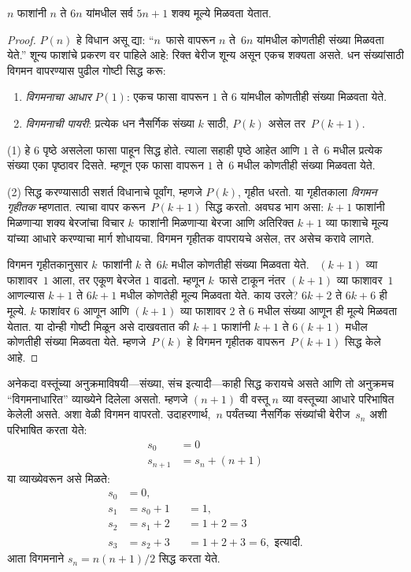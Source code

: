\documentclass[../../../include/open-logic-section]{subfiles}
\begin{document}
\begin{thm}
$n$ फाशांनी $n$ ते $6n$ यांमधील सर्व $5n+1$ शक्य मूल्ये मिळवता येतात.
\end{thm}

\begin{proof}
$P(n)$ हे विधान असू द्या: “$n$~फासे वापरून $n$ ते~$6n$ यांमधील कोणतीही संख्या मिळवता येते.” शून्य फाशांचे प्रकरण वर पाहिले आहे: रिक्त बेरीज शून्य असून एकच शक्यता असते. धन संख्यांसाठी विगमन वापरण्यास पुढील गोष्टी सिद्ध करू:
\begin{enumerate}
\item \emph{विगमनाचा आधार} $P(1)$: एकच फासा वापरून $1$ ते $6$ यांमधील कोणतीही संख्या मिळवता येते.
\item \emph{विगमनाची पायरी}: प्रत्येक धन नैसर्गिक संख्या $k$ साठी, $P(k)$ असेल तर~$P(k+1)$.
\end{enumerate}

(1) हे $6$ पृष्ठे असलेला फासा पाहून सिद्ध होते. त्याला सहाही पृष्ठे आहेत आणि $1$ ते~$6$ मधील प्रत्येक संख्या एका पृष्ठावर दिसते. म्हणून एक फासा वापरून $1$ ते~$6$ मधील कोणतीही संख्या मिळवता येते.

(2) सिद्ध करण्यासाठी सशर्त विधानाचे पूर्वांग, म्हणजे $P(k)$, गृहीत धरतो. या गृहीतकाला \emph{विगमन गृहीतक} म्हणतात. त्याचा वापर करून~$P(k+1)$ सिद्ध करतो. अवघड भाग असा: $k+1$ फाशांनी मिळणाऱ्या शक्य बेरजांचा विचार $k$~फाशांनी मिळणाऱ्या बेरजा आणि अतिरिक्त $k+1$ व्या फाशाचे मूल्य यांच्या आधारे करण्याचा मार्ग शोधायचा. विगमन गृहीतक वापरायचे असेल, तर असेच करावे लागते.

विगमन गृहीतकानुसार $k$~फाशांनी $k$ ते~$6k$ मधील कोणतीही संख्या मिळवता येते. ~$(k+1)$ व्या फाशावर~$1$ आला, तर एकूण बेरजेत $1$ वाढतो. म्हणून $k$~फासे टाकून नंतर $(k+1)$ व्या फाशावर~$1$ आणल्यास $k+1$ ते $6k+1$ मधील कोणतेही मूल्य मिळवता येते. काय उरले? $6k+2$ ते $6k+6$ ही मूल्ये. $k$ फाशांवर $6$ आणून आणि $(k+1)$ व्या फाशावर $2$ ते $6$ मधील संख्या आणून ही मूल्ये मिळवता येतात. या दोन्ही गोष्टी मिळून असे दाखवतात की $k+1$ फाशांनी $k+1$ ते $6(k+1)$ मधील कोणतीही संख्या मिळवता येते. म्हणजे~$P(k)$ हे विगमन गृहीतक वापरून~$P(k+1)$ सिद्ध केले आहे.
\end{proof}

अनेकदा वस्तूंच्या अनुक्रमाविषयी---संख्या, संच इत्यादी---काही सिद्ध करायचे असते आणि तो अनुक्रमच “विगमनाधारित” व्याख्येने दिलेला असतो. म्हणजे $(n+1)$ वी वस्तू $n$ व्या वस्तूच्या आधारे परिभाषित केलेली असते. अशा वेळी विगमन वापरतो. उदाहरणार्थ,~$n$ पर्यंतच्या नैसर्गिक संख्यांची बेरीज~$s_n$ अशी परिभाषित करता येते:
\begin{align*}
  s_0 & = 0\\
  s_{n+1} & = s_n + (n+1)
\end{align*}
या व्याख्येवरून असे मिळते:
\begin{align*}
  s_0 & = 0,\\
  s_1 & = s_0 + 1 && = 1,\\
  s_2 & = s_1 + 2 && = 1 + 2 = 3\\
  s_3 & = s_2 + 3 && = 1 + 2 + 3 = 6, \text{ इत्यादी.}
\end{align*}
आता विगमनाने $s_n = n(n+1)/2$ सिद्ध करता येते.
\end{document}
